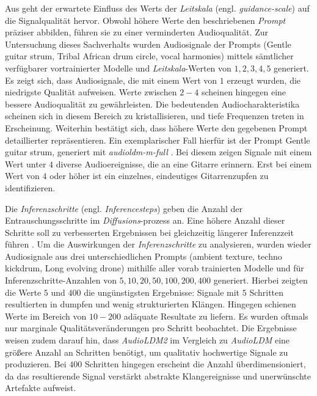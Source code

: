\documentclass[
  a4paper,  %
  twoside,  %
  bibliography=totoc,
  headsepline,
  cleardoublepage=empty,
  parskip=half,
  draft=false
]{scrbook}
\begin{document}
Aus \cite{noauthor_huggingface_nodate-1, noauthor_huggingface_nodate} geht der erwartete Einfluss des Werts der \emph{Leitskala} (engl. \emph{guidance-scale}) auf die Signalqualität hervor. Obwohl höhere Werte den beschriebenen \emph{Prompt} präziser abbilden, führen sie zu einer verminderten Audioqualität. Zur Untersuchung dieses Sachverhalts wurden Audiosignale der Prompts (\glqq Gentle guitar strum, Tribal African drum circle, vocal harmonies\grqq) mittels sämtlicher verfügbarer vortrainierter Modelle und \emph{Leitskala}-Werten von $1,2,3,4,5$ generiert. Es zeigt sich, dass Audiosignale, die mit einem Wert von $1$ erzeugt wurden, die niedrigste Qualität aufweisen. Werte zwischen $2-4$ scheinen hingegen eine bessere Audioqualität zu gewährleisten. Die bedeutenden Audiocharakteristika scheinen sich in diesem Bereich zu kristallisieren, und tiefe Frequenzen treten in Erscheinung. Weiterhin bestätigt sich, dass höhere Werte den gegebenen Prompt detaillierter repräsentieren. Ein exemplarischer Fall hierfür ist der Prompt \glqq Gentle guitar strum\grqq, generiert mit \emph{audioldm-m-full} \cite{noauthor_cvsspaudioldm-m-full_nodate}. Bei diesem zeigen Signale mit einem Wert unter $4$ diverse Audioereignisse, die an eine Gitarre erinnern. Erst bei einem Wert von $4$ oder höher ist ein einzelnes, eindeutiges Gitarrenzupfen zu identifizieren.

Die \emph{Inferenzschritte} (engl. \emph{Inferencesteps}) geben die Anzahl der Entrauschungsschritte im \emph{Diffusions}-prozess an. Eine höhere Anzahl dieser Schritte soll zu verbesserten Ergebnissen bei gleichzeitig längerer Inferenzzeit führen \cite{noauthor_huggingface_nodate-1, noauthor_huggingface_nodate}. Um die Auswirkungen der \emph{Inferenzschritte} zu analysieren, wurden wieder Audiosignale aus drei unterschiedlichen Prompts (\glqq ambient texture\grqq, \glqq techno kickdrum\grqq, \glqq Long evolving drone\grqq) mithilfe aller vorab trainierten Modelle und für Inferenzschritte-Anzahlen von $5,10,20,50,100,200,400$ generiert. Hierbei zeigten die Werte $5$ und $400$ die ungünstigsten Ergebnisse: Signale mit $5$ Schritten resultierten in dumpfen und wenig strukturierten Klängen. Hingegen schienen Werte im Bereich von $10-200$ adäquate Resultate zu liefern. Es wurden oftmals nur marginale Qualitätsveränderungen pro Schritt beobachtet. Die Ergebnisse weisen zudem darauf hin, dass \emph{AudioLDM2} im Vergleich zu \emph{AudioLDM} eine größere Anzahl an Schritten benötigt, um qualitativ hochwertige Signale zu produzieren. Bei $400$ Schritten hingegen erscheint die Anzahl überdimensioniert, da das resultierende Signal verstärkt abstrakte Klangereignisse und unerwünschte Artefakte aufweist.
\end{document}
